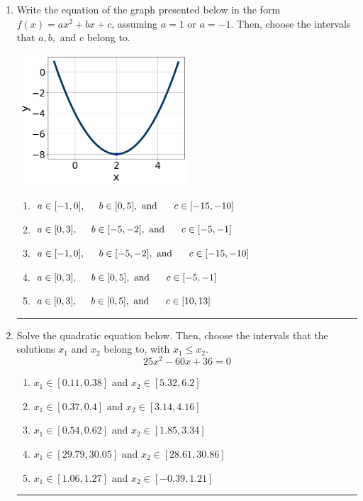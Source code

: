 \documentclass[14pt]{extbook}
\newcommand{\litem}[1]{\item#1\hspace*{-1cm}\rule{\textwidth}{0.4pt}}
\begin{document}
\begin{enumerate}
{\begin{enumerate}[label=\Alph*.]
\end{enumerate} }
\litem{
Write the equation of the graph presented below in the form $f(x)=ax^2+bx+c$, assuming  $a=1$ or $a=-1$. Then, choose the intervals that $a, b,$ and $c$ belong to.
\begin{center}
    \includegraphics[width=0.5\textwidth]{../Figures/quadraticGraphToEquationB.png}
\end{center}
\begin{enumerate}[label=\Alph*.]
\item \( a \in [-1, 0], \hspace*{5mm} b \in [0, 5], \text{ and } \hspace*{5mm} c \in [-15, -10] \)
\item \( a \in [0, 3], \hspace*{5mm} b \in [-5, -2], \text{ and } \hspace*{5mm} c \in [-5, -1] \)
\item \( a \in [-1, 0], \hspace*{5mm} b \in [-5, -2], \text{ and } \hspace*{5mm} c \in [-15, -10] \)
\item \( a \in [0, 3], \hspace*{5mm} b \in [0, 5], \text{ and } \hspace*{5mm} c \in [-5, -1] \)
\item \( a \in [0, 3], \hspace*{5mm} b \in [0, 5], \text{ and } \hspace*{5mm} c \in [10, 13] \)

\end{enumerate} }
\litem{
Solve the quadratic equation below. Then, choose the intervals that the solutions $x_1$ and $x_2$ belong to, with $x_1 \leq x_2$.\[ 25x^{2} -60 x + 36 = 0 \]\begin{enumerate}[label=\Alph*.]
\item \( x_1 \in [0.11, 0.38] \text{ and } x_2 \in [5.32, 6.2] \)
\item \( x_1 \in [0.37, 0.4] \text{ and } x_2 \in [3.14, 4.16] \)
\item \( x_1 \in [0.54, 0.62] \text{ and } x_2 \in [1.85, 3.34] \)
\item \( x_1 \in [29.79, 30.05] \text{ and } x_2 \in [28.61, 30.86] \)
\item \( x_1 \in [1.06, 1.27] \text{ and } x_2 \in [-0.39, 1.21] \)


\end{enumerate}}
\end{enumerate}
\end{document}
